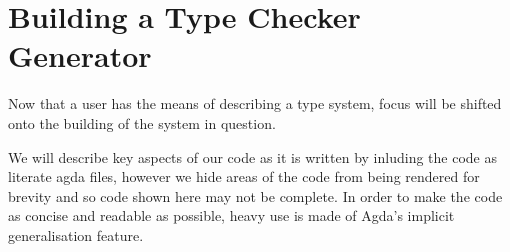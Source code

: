 \chapter{Building a Type Checker Generator}

Now that a user has the means of describing a type system, focus will
be shifted onto the building of the system in question.

We will describe key aspects of our code as it is written by inluding
the code as literate agda files, however we hide areas of the code
from being rendered for brevity and so code shown here may not be
complete. In order to make the code as concise and readable as
possible, heavy use is made of Agda's implicit generalisation feature.









